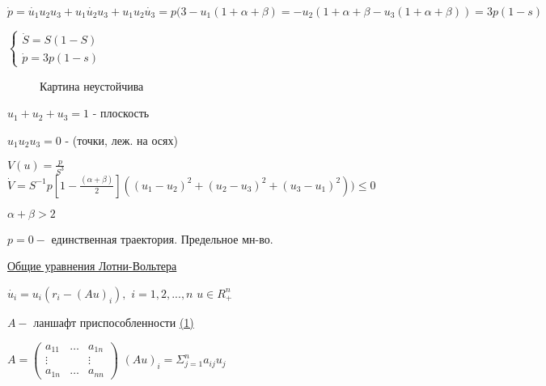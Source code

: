 \vspace{0.5cm}
\(
\dot{p} = \dot{u_1}u_2u_3 + u_1\dot{u_2}u_3+u_1u_2\dot{u_3}=p(3-u_1(1+\alpha + \beta)=-u_2(1+\alpha+\beta - u_3(1+\alpha + \beta)) = 3p(1-s)
\)

\newpage
\(
	\begin{cases}
	\dot{S} = S(1-S)
	\\
	\dot{p} = 3p(1-s)
	\end{cases}
\)

\begin{figure} [h!]
			\caption{Картина неустойчива}	
\end{figure}

\vspace{0.5cm}
\(
u_1 + u_2 +u_3 = 1
\) - плоскость

\vspace{0.5cm}
\(
u_1u_2u_3 = 0
\) - (точки, леж. на осях)

\vspace{0.5cm}
\(
V(u) = \frac{p}{S^3}
\) \hspace{0.2cm}
\(
\dot{V} = S^{-1}p \left[ 1 - \frac{(\alpha + \beta)}{2} \right]((u_1 - u_2)^2 + (u_2-u_3)^2 +(u_3-u_1)^2))\leq 0
\)

\vspace{0.5cm}
\(
\alpha + \beta > 2
\)

\vspace{0.5cm}
\(
 p = 0 - 
\) единственная траектория. Предельное мн-во.

\vspace{0.5cm}
\underline{Общие уравнения Лотни-Вольтера}

\vspace{0.5cm}
\(
\dot{u_i} = u_i(r_i-(Au)_i) , 
\)\hspace{0.2cm}
\(
i = 1,2,...,n
\)
\hspace{0.2cm}
\(
u \in R_+^n
\)


\vspace{0.5cm}
\(
A - 
\) ланшафт приспособленности \underline{(1)}


\vspace{0.5cm}
\(
A = 
	\begin{pmatrix}
	a_11 & \ldots & a_{1n} \\
	\vdots & & \vdots \\
	a_{1n} & \ldots & a_{nn}
	\end{pmatrix}
\)\hspace{0.7cm}
\(
(Au)_i = \Sigma_{j=1}^n a_{ij}u_j
\)

